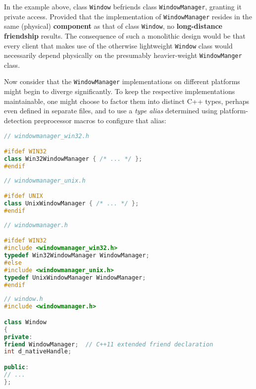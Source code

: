 \noindent In the example above, class \texttt{Window} befriends class
\texttt{WindowManager}, granting it private access. Provided that the
implementation of \texttt{WindowManager} resides in the same (physical)
\textbf{component} as that of class \texttt{Window}, no
\textbf{long-distance friendship} results. The consequence of such a
monolithic design would be that every client that makes use of the
otherwise lightweight \texttt{Window} class would necessarily depend
physically on the presumably heavier-weight \texttt{WindowManger} class.

Now consider that the \texttt{WindowManager} implementations on
different platforms might begin to diverge significantly. To keep the
respective implementations maintainable, one might choose to factor them
into distinct C++ types, perhaps even defined in separate files, and to
use a \emph{type alias} determined using platform-detection preprocessor
macros to configure that alias:


\begin{lstlisting}[language=C++]
// windowmanager_win32.h

#ifdef WIN32
class Win32WindowManager { /* ... */ };
#endif
\end{lstlisting}

\vspace*{2ex}

\begin{lstlisting}[language=C++]
// windowmanager_unix.h

#ifdef UNIX
class UnixWindowManager { /* ... */ };
#endif
\end{lstlisting}

\vspace*{2ex}

\begin{lstlisting}[language=C++]
// windowmanager.h

#ifdef WIN32
#include <windowmanager_win32.h>
typedef Win32WindowManager WindowManager;
#else
#include <windowmanager_unix.h>
typedef UnixWindowManager WindowManager;
#endif
\end{lstlisting}

\vspace*{2ex}

\begin{lstlisting}[language=C++]
// window.h
#include <windowmanager.h>

class Window
{
private:
friend WindowManager;  // C++11 extended friend declaration
int d_nativeHandle;

public:
// ...
};
\end{lstlisting}

